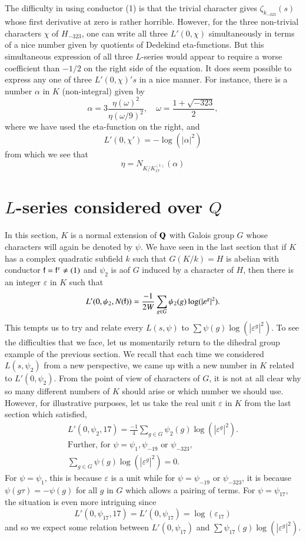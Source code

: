 The difficulty in using conductor (1) is that the trivial character gives $\zeta_{k_{-323}} (s)$ whose first derivative at zero is rather horrible. However, for the three non-trivial characters $\chi$ of $H_{-323}$, one can write all three $L' (0, \chi)$ simultaneously in terms of a nice number given by quotients of Dedekind eta-functions. But this simultaneous expression of all three $L$-series would appear to require a worse coefficient than $-1/2$ on the right side of the equation. It does seem possible to express any one of three $L' (0, \chi)'s$ in a nice manner. For instance, there is a number $\alpha$ in $K$ (non-integral) given by
$$
\alpha = 3 \frac{\eta(\omega)^2}{\eta(\omega/9)^2}, \quad \omega = \frac{1+\sqrt{-323}}{2},
$$
where we have used the eta-function on the right, and 
$$
L' (0, \chi') = - \log (|\alpha|^2)
$$
from which we see that 
$$
\eta = N_{K/K^{(1)}_{17}} (\alpha)
$$

\section{$L$-series considered over $Q$}\label{art9-sec3} 
In this section, $K$ is a normal extension of $\mathbf{Q}$ with Galois group $G$ whose characters will again be denoted by $\psi$. We have seen in the last section that if $K$ has a complex quadratic subfield $k$ such that $G (K/k) = H$ is abelian with conductor $\mathsf{f} = \mathsf{f}^\tau \neq (1)$ and $\psi_2$ is a\pageoriginale of $G$ induced by a character of $H$, then there is an integer $\varepsilon$ in $K$ such that 
$$
L'(0, \psi_2, N (\mathsf{f})) =\frac{-1}{2W} \sum\limits_{g \in G} \psi_2 (g) \log (|\varepsilon^g|^2).
$$
This tempts us to try and relate every $L (s, \psi)$ to $\sum \psi (g) \log (|\varepsilon^g|^2)$.
To see the difficulties that we face, let us momentarily return to the dihedral group example of the previous section. We recall that each time we considered $L(s, \psi_2)$ from a new perspective, we came up with a new number in $K$ related to $L' (0, \psi_2)$. From  the point of view of characters of $G$, it is not at all clear why so many different numbers of $K$ should arise or which number we should use. However, for illustrative purposes, let us take the real unit $\varepsilon$ in $K$ from the last section which satisfied,
\begin{gather*}
L' (0, \psi_2, 17) = \frac{-1}{4} \sum\limits_{g \in G} \psi_2 (g) \log (|\varepsilon^g|^2).\\
\text{Further, for } \psi = \psi_1, \psi_{-19} \text{ or } \psi_{-323},\\
\sum\limits_{g \in G} \psi (g) \log (|\varepsilon^g|^2) = 0.
\end{gather*}
For $\psi = \psi_1$, this is because $\varepsilon$ is a unit while for $\psi = \psi_{-19}$ or $\psi_{-323}$, it is because $\psi (g\tau) = - \psi (g)$ for all $g$ in $G$ which allows a pairing of terms. For $\psi = \psi_{17}$, the situation is even more intriguing since 
$$
L' (0, \psi_{17}, 17) = L' (0, \psi_{17}) = \log (\varepsilon_{17})
$$
and so we expect some relation between $L' (0, \psi_{17})$ and $\sum \psi_{17} (g) \log (|\varepsilon^g|^2)$.

